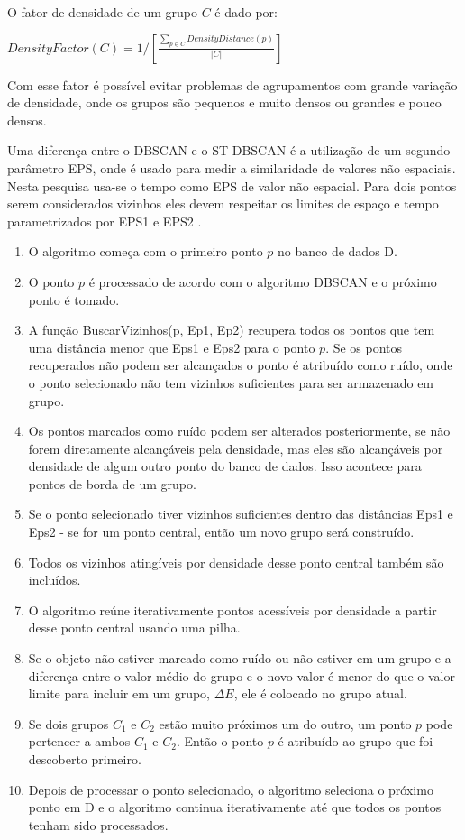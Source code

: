 O fator de densidade de um grupo ${C}$ é dado por:

${DensityFactor(C) = 1\big/\left [   \frac{\sum_{p\in C}DensityDistance(p)}{|C|} \right ]}$
\linebreak

Com esse fator é possível evitar problemas de agrupamentos com grande variação de densidade, onde os grupos são pequenos e muito densos ou grandes e pouco densos.

Uma diferença entre o \acrshort{DBSCAN} e o \acrshort{ST-DBSCAN} é a utilização de um segundo parâmetro EPS, onde é usado para medir a similaridade de valores não espaciais. Nesta pesquisa usa-se o tempo como EPS de valor não espacial. Para dois pontos serem considerados vizinhos eles devem respeitar os limites de espaço e tempo parametrizados por EPS1 e EPS2 \cite{Birant2007STDBSCANAA}.

\begin{enumerate}
	\item O algoritmo começa com o primeiro ponto ${p}$ no banco de dados D.
	\item O ponto ${p}$ é processado de acordo com o algoritmo \acrshort{DBSCAN} e o próximo ponto é tomado.
	\item A função BuscarVizinhos(p, Ep1, Ep2) recupera todos os pontos que tem uma distância menor que Eps1 e Eps2 para o ponto ${p}$. Se os pontos recuperados não podem ser alcançados o ponto é atribuído como ruído, onde o ponto selecionado não tem vizinhos suficientes para ser armazenado em grupo.
	\item Os pontos marcados como ruído podem ser alterados posteriormente, se não forem diretamente alcançáveis pela densidade, mas eles são alcançáveis por densidade de algum outro ponto do banco de dados. Isso acontece para pontos de borda de um grupo.
	\item Se o ponto selecionado tiver vizinhos suficientes dentro das distâncias Eps1 e Eps2 - se for um ponto central, então um novo grupo será construído.
	\item Todos os vizinhos atingíveis por densidade desse ponto central também são incluídos.
	\item O algoritmo reúne iterativamente pontos acessíveis por densidade a partir desse ponto central usando uma pilha.
	\item Se o objeto não estiver marcado como ruído ou não estiver em um grupo e a diferença entre o valor médio do grupo e o novo valor é menor do que o valor limite para incluir em um grupo, ${\Delta E}$, ele é colocado no grupo atual.
	\item Se dois grupos ${C_1}$ e ${C_2}$ estão muito próximos um do outro, um ponto ${p}$ pode pertencer a ambos ${C_1}$ e ${C_2}$. Então o ponto ${p}$ é atribuído ao grupo que foi descoberto primeiro.
	\item Depois de processar o ponto selecionado, o algoritmo seleciona o próximo ponto em D e o algoritmo continua iterativamente até que todos os pontos tenham sido processados.
\end{enumerate}

